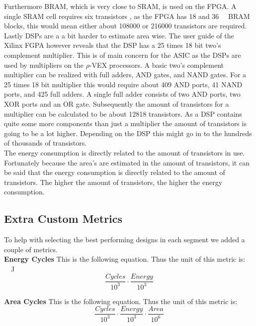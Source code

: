 Furthermore BRAM, which is very close to SRAM, is used on the FPGA. 
A single SRAM cell requires six transistors  \cite{betz}, as the FPGA has \num{18} and \SI{36}{\kibi\byte} BRAM blocks, this would mean either about \num{108000} or \num{216000} transistors are required. 
Lastly DSPs are a a bit harder to estimate area wise. 
The user guide of the Xilinx FGPA however reveals that the DSP has a \num{25} times \num{18} bit two's complement multiplier. 
This is of main concern for the ASIC as the DSPs are used by multipliers on the $\rho$-VEX processors. 
A basic two's complement multiplier can be realized with full adders, AND gates, and NAND gates. 
For a \num{25} times \num{18} bit multiplier this would require about \num{409} AND ports, \num{41} NAND ports, and \num{425} full adders. 
A single full adder consists of two AND ports, two XOR ports and an OR gate.
Subsequently the amount of transistors for a multiplier can be calculated to be about \num{12818} transistors.
As a DSP contains quite some more components than just a multiplier the amount of transistors is going to be a lot higher.
Depending on the DSP this might go in to the hundreds of thousands of transistors.\\
The energy consumption is directly related to the amount of transistors in use. 
Fortunately because the area's are estimated in the amount of transistors, it can be said that the energy consumption is directly related to the amount of transistors. 
The higher the amount of transistors, the higher the energy consumption.


\subsection{Extra Custom Metrics}
\label{ssec:soc-design-extra-custom-metrics}
To help with selecting the best performing designs in each segment we added a couple of metrics.\\

\textbf{Energy Cycles}
This is the following equation. Thus the unit of this metric is: \si{\kilo\cycles\joule}
\begin{equation}
\frac{Cycles}{10^3} \cdot \frac{Energy}{10^3}
\end{equation}

\textbf{Area Cycles}
This is the following equation. Thus the unit of this metric is: \si{\kilo\cycles\giga\transistors}
\begin{equation}
\frac{Cycles}{10^3} \cdot \frac{Energy}{10^3} \cdot \frac{Area}{10^6}
\end{equation}

